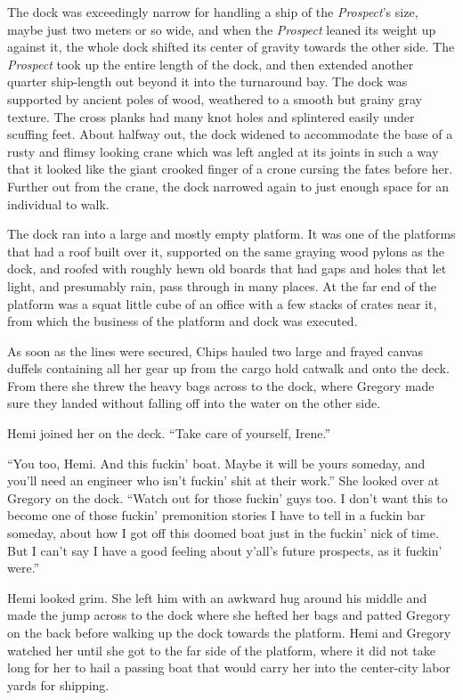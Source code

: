 \documentclass[
]{scrbook}
\begin{document}
The dock was exceedingly narrow for handling a ship of the
\emph{Prospect}'s size, maybe just two meters or so wide, and when the
\emph{Prospect} leaned its weight up against it, the whole dock shifted
its center of gravity towards the other side. The \emph{Prospect} took
up the entire length of the dock, and then extended another quarter
ship-length out beyond it into the turnaround bay. The dock was
supported by ancient poles of wood, weathered to a smooth but grainy
gray texture. The cross planks had many knot holes and splintered easily
under scuffing feet. About halfway out, the dock widened to accommodate
the base of a rusty and flimsy looking crane which was left angled at
its joints in such a way that it looked like the giant crooked finger of
a crone cursing the fates before her. Further out from the crane, the
dock narrowed again to just enough space for an individual to walk.

The dock ran into a large and mostly empty platform. It was one of the
platforms that had a roof built over it, supported on the same graying
wood pylons as the dock, and roofed with roughly hewn old boards that
had gaps and holes that let light, and presumably rain, pass through in
many places. At the far end of the platform was a squat little cube of
an office with a few stacks of crates near it, from which the business
of the platform and dock was executed.

As soon as the lines were secured, Chips hauled two large and frayed
canvas duffels containing all her gear up from the cargo hold catwalk
and onto the deck. From there she threw the heavy bags across to the
dock, where Gregory made sure they landed without falling off into the
water on the other side.

Hemi joined her on the deck. ``Take care of yourself, Irene.''

``You too, Hemi. And this fuckin' boat. Maybe it will be yours someday,
and you'll need an engineer who isn't fuckin' shit at their work.'' She
looked over at Gregory on the dock. ``Watch out for those fuckin' guys
too. I don't want this to become one of those fuckin' premonition
stories I have to tell in a fuckin bar someday, about how I got off this
doomed boat just in the fuckin' nick of time. But I can't say I have a
good feeling about y'all's future prospects, as it fuckin' were.''

Hemi looked grim. She left him with an awkward hug around his middle and
made the jump across to the dock where she hefted her bags and patted
Gregory on the back before walking up the dock towards the platform.
Hemi and Gregory watched her until she got to the far side of the
platform, where it did not take long for her to hail a passing boat that
would carry her into the center-city labor yards for shipping.
\end{document}
